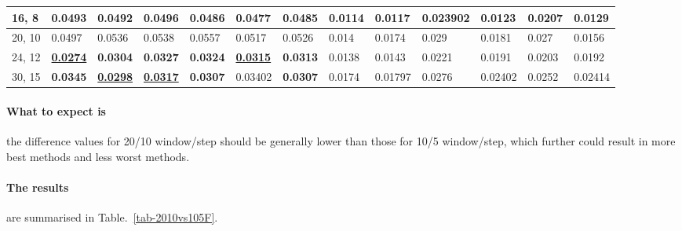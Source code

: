 \begin{table*}
{\begin{tabular}{|l|l|l|l|l|l|l|l|l|l|l|l|l|}
16, 8 & 0.0493 & 0.0492 & 0.0496 & 0.0486 & 0.0477 & 0.0485 & 0.0114 & 0.0117 & 0.023902 & {\color[HTML]{32CB00} \textbf{0.0123}} & 0.0207 & 0.0129 \\ \hline
20, 10 & 0.0497 & 0.0536 & 0.0538 & 0.0557 & 0.0517 & 0.0526 & 0.014 & 0.0174 & 0.029 & 0.0181 & 0.027 & 0.0156 \\ \hline
24, 12 & {\color[HTML]{009901} {\ul \textbf{0.0274}}} & {\color[HTML]{32CB00} \textbf{0.0304}} & {\color[HTML]{34FF34} \textbf{0.0327}} & {\color[HTML]{34FF34} \textbf{0.0324}} & {\color[HTML]{009901} {\ul \textbf{0.0315}}} & {\color[HTML]{34FF34} \textbf{0.0313}} & 0.0138 & 0.0143 & 0.0221 & 0.0191 & 0.0203 & 0.0192 \\ \hline
30, 15 & {\color[HTML]{34FF34} \textbf{0.0345}} & {\color[HTML]{009901} {\ul \textbf{0.0298}}} & {\color[HTML]{009901} {\ul \textbf{0.0317}}} & {\color[HTML]{32CB00} \textbf{0.0307}} & 0.03402 & {\color[HTML]{32CB00} \textbf{0.0307}} & 0.0174 & 0.01797 & 0.0276 & 0.02402 & 0.0252 & 0.02414 \\ \hline
\end{tabular}%
}
\end{table*}

\paragraph{What to expect is}
the difference values for 20/10 window/step should be generally lower than those
for 10/5 window/step, which further could result in more best methods and less
worst methods.

\paragraph{The results}
are summarised in Table.~\ref{tab-2010vs105F}.

